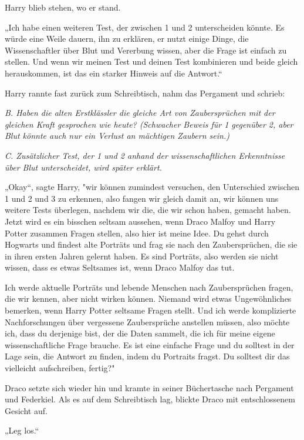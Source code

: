 {Harry blieb stehen, wo er stand.

„Ich habe einen weiteren Test, der zwischen 1 und 2 unterscheiden könnte. Es würde eine Weile dauern, ihn zu erklären, er nutzt einige Dinge, die Wissenschaftler über Blut und Vererbung wissen, aber die Frage ist einfach zu stellen. Und wenn wir meinen Test und deinen Test kombinieren und beide gleich herauskommen, ist das ein starker Hinweis auf die Antwort.“

Harry rannte fast zurück zum Schreibtisch, nahm das Pergament und schrieb:

\emph{B. Haben die alten Erstklässler die gleiche Art von Zaubersprüchen mit der gleichen Kraft gesprochen wie heute? (Schwacher Beweis für 1 gegenüber 2, aber Blut könnte auch nur ein Verlust an mächtigen Zaubern sein.)}

\emph{C. Zusätzlicher Test, der 1 und 2 anhand der wissenschaftlichen Erkenntnisse über Blut unterscheidet, wird später erklärt.}

„Okay“, sagte Harry, "wir können zumindest versuchen, den Unterschied zwischen 1 und 2 und 3 zu erkennen, also fangen wir gleich damit an, wir können uns weitere Tests überlegen, nachdem wir die, die wir schon haben, gemacht haben. Jetzt wird es ein bisschen seltsam aussehen, wenn Draco Malfoy und Harry Potter zusammen Fragen stellen, also hier ist meine Idee. Du gehst durch Hogwarts und findest alte Porträts und frag sie nach den Zaubersprüchen, die sie in ihren ersten Jahren gelernt haben. Es sind Porträts, also werden sie nicht wissen, dass es etwas Seltsames ist, wenn Draco Malfoy das tut.

Ich werde aktuelle Porträts und lebende Menschen nach Zaubersprüchen fragen, die wir kennen, aber nicht wirken können. Niemand wird etwas Ungewöhnliches bemerken, wenn Harry Potter seltsame Fragen stellt. Und ich werde komplizierte Nachforschungen über vergessene Zaubersprüche anstellen müssen, also möchte ich, dass du derjenige bist, der die Daten sammelt, die ich für meine eigene wissenschaftliche Frage brauche. Es ist eine einfache Frage und du solltest in der Lage sein, die Antwort zu finden, indem du Portraits fragst. Du solltest dir das vielleicht aufschreiben, fertig?"

Draco setzte sich wieder hin und kramte in seiner Büchertasche nach Pergament und Federkiel. Als es auf dem Schreibtisch lag, blickte Draco mit entschlossenem Gesicht auf.

„Leg los.“

}
